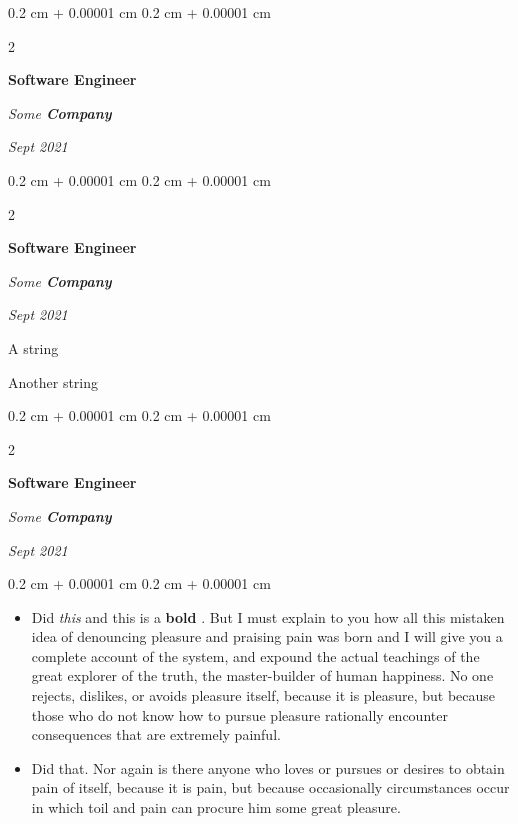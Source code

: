 \documentclass[10pt, letterpaper]{article}
\newenvironment{summary}{
    \begin{description}[
        topsep=0.10 cm,
        parsep=0.10 cm,
        partopsep=0pt,
        itemsep=0pt,
        leftmargin=0.4 cm + 10pt
    ]
}{
    \end{description}
} %
\newenvironment{highlights}{
    \begin{itemize}[
        topsep=0.10 cm,
        parsep=0.10 cm,
        partopsep=0pt,
        itemsep=0pt,
        leftmargin=0.4 cm + 10pt
    ]
}{
    \end{itemize}
} %
\newenvironment{onecolentry}{
    \begin{adjustwidth}{
        0.2 cm + 0.00001 cm
    }{
        0.2 cm + 0.00001 cm
    }
}{
    \end{adjustwidth}
} %
\newenvironment{twocolentry}[2][]{
    \onecolentry
    \def\secondColumn{#2}
    \setcolumnwidth{\fill, 4.5 cm}
    \begin{paracol}{2}
}{
    \switchcolumn \raggedleft \secondColumn
    \end{paracol}
    \endonecolentry
} %
\let\hrefWithoutArrow\href
\renewcommand{\href}[2]{\hrefWithoutArrow{#1}{\ifthenelse{\equal{#2}{}}{ }{#2 }\raisebox{.15ex}{\footnotesize \faExternalLink*}}}
\begin{document}
        \begin{twocolentry}{
            
            
        \textit{Sept 2021}}
            \textbf{Software Engineer}
            
            \textit{Some \textbf{Company}}
        \end{twocolentry}


        \vspace{0.2 cm}

        \begin{twocolentry}{
            
            
        \textit{Sept 2021}}
            \textbf{Software Engineer}
            
            \textit{Some \textbf{Company}}
        \end{twocolentry}
            \begin{summary}
                \item A string
                \item Another string
            \end{summary}


        \vspace{0.2 cm}

        \begin{twocolentry}{
            
            
        \textit{Sept 2021}}
            \textbf{Software Engineer}
            
            \textit{Some \textbf{Company}}
        \end{twocolentry}
        \vspace{0.10 cm}
        \begin{onecolentry}
            \begin{highlights}
                \item Did \textit{this} and this is a \textbf{bold} \href{https://example.com}{link}. But I must explain to you how all this mistaken idea of denouncing pleasure and praising pain was born and I will give you a complete account of the system, and expound the actual teachings of the great explorer of the truth, the master-builder of human happiness. No one rejects, dislikes, or avoids pleasure itself, because it is pleasure, but because those who do not know how to pursue pleasure rationally encounter consequences that are extremely painful.
                \item Did that. Nor again is there anyone who loves or pursues or desires to obtain pain of itself, because it is pain, but because occasionally circumstances occur in which toil and pain can procure him some great pleasure.
            \end{highlights}
        \end{onecolentry}
\end{document}
